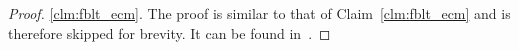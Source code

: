 \documentclass[prodmode,acmtecs]{acmsmall}
\begin{document}
\begin{compactenum}
\begin{proof}
\ref{clm:fblt_ecm}.
The proof is similar to that of Claim~\ref{clm:fblt_ecm} and is therefore skipped for  brevity.  It can be found in~\cite{stmconcurrencycontrol_techreport}.
\begin{comment}
By substituting $RC_{A}(T_{i})$ and $RC_{B}(T_{i})$ in (\ref{eq:utilization comparison})
with (\ref{eq:fblt_rc}) and (6.7) in \cite{shambake_phd_proposal}, respectively, we get:
\begin{eqnarray}
 & \sum_{\forall\tau_{i}}\frac{\sum_{\forall s_{i}^{k}\in s_{i}}\left(\delta_i^klen(s_{i}^{k})+\sum_{\forall s_{iz}^{k}\in\chi_{i}^{k}}len(s_{iz}^{k})\right)+RC_{re}(T_{i})}{T_{i}}\label{eq:fblt_lcm_edf_comparison_1}\\
\le & \sum_{\forall\tau_{i}}\frac{\left(\sum_{\forall\tau_{j}\in\gamma_{i}^{ex}}\sum_{\theta\in\theta_{i}^{ex}}\left(\left\lceil \frac{T_{i}}{T_{j}}\right\rceil \sum_{\forall\bar{s_{j}^{h}(\theta)}}len\left(\bar{s_{j}^{h}(\theta)}+\bar{\alpha_{max}^{jh}}s_{max}^{j}(\theta)\right)\right)\right)}{T_{i}}\nonumber \\
+ & \sum_{\forall\tau_{i}}\frac{\left(\sum_{\forall s_{i}^{k}}\left(1-\alpha_{max}^{ik}\right)len\left(s_{max}^{i}\right)\right)+RC_{re}(T_{i})}{T_{i}}\nonumber 
\end{eqnarray}
%
Let $\theta_{i}^{ex}=\theta_{i}+\theta_{i}^{*}$, where $\theta_{i}^{*}$
is the set of objects not accessed directly by $\tau_{i}$, but can
cause transactions in $\tau_{i}$ to retry due to transitive retry.
Let $\gamma_{i}^{ex}=\gamma_{i}+\gamma_{i}^{*}$, where $\gamma_{i}^{*}$
is the set of tasks that access objects in $\theta_{i}^{*}$. $\bar{s_{j}^{h}}(\theta)$
can access multiple objects, so $s_{max}^{j}(\theta)$ is the maximum
length transaction conflicting with $\bar{s_{j}^{h}}(\theta)$. $\bar{s_{j}^{h}}(\theta)$ is included only once for all $\theta \in \Theta_j^h$. Each $\theta \in \theta_i^{ex}$ has its own $s_{max}^j(\theta)$. But $s_i^h$ can access multiple objects, denoted as $\Theta_j^h$. So, $s_{max}^j(\theta)$ is replaced by $s_{max}^j(\Theta_j^h)$, where $s_{max}^j(\Theta_j^h)=max\{s_{max}^j(\theta),\forall \theta \in \Theta_j^h\}$. 
 $s_{max}^j(\Theta_j^h)$ is included once for each $\theta \in \theta_i$. 
 

\end{comment}
\end{proof}
\end{compactenum}
\end{document}
